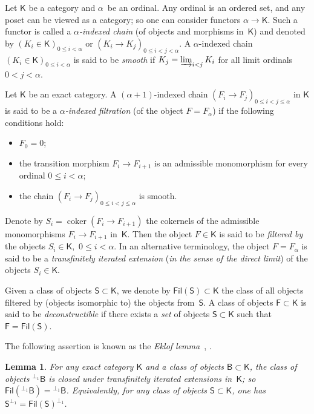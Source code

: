 \documentclass[12pt,a4paper]{amsart}
\newcommand{\+}{\nobreakdash-}
\renewcommand{\:}{\colon}
\newcommand{\rarrow}{\longrightarrow}
\DeclareMathOperator{\coker}{coker}
\newcommand{\sB}{\mathsf B}
\newcommand{\sF}{\mathsf F}
\newcommand{\sK}{\mathsf K}
\newcommand{\sS}{\mathsf S}
\newcommand{\Fil}{\mathsf{Fil}}
\theoremstyle{plain}
\newtheorem{lem}[thm]{Lemma}
\theoremstyle{definition}
\begin{document}
 Let $\sK$ be a category and $\alpha$~be an ordinal.
 Any ordinal is an ordered set, and any poset can be viewed as
a category; so one can consider functors $\alpha\rarrow\sK$.
 Such a functor is called a \emph{$\alpha$\+indexed chain} (of
objects and morphisms in~$\sK$) and denoted by
$(K_i\in\sK)_{0\le i<\alpha}$ or $(K_i\to K_j)_{0\le i<j<\alpha}$.
 A $\alpha$\+indexed chain $(K_i\in\sK)_{0\le i<\alpha}$ is said
to be \emph{smooth} if $K_j=\varinjlim_{i<j}K_i$ for all limit
ordinals $0<j<\alpha$.

 Let $\sK$ be an exact category.
 A $(\alpha+1)$\+indexed chain $(F_i\to F_j)_{0\le i<j\le\alpha}$ in
$\sK$ is said to be a \emph{$\alpha$\+indexed filtration} (of
the object $F=F_\alpha$) if the following conditions hold:
\begin{itemize}
\item $F_0=0$;
\item the transition morphism $F_i\rarrow F_{i+1}$ is an admissible
monomorphism for every ordinal $0\le i<\alpha$;
\item the chain $(F_i\to F_j)_{0\le i<j\le\alpha}$ is smooth.
\end{itemize}
 Denote by $S_i=\coker(F_i\to F_{i+1})$ the cokernels of the admissible
monomorphisms $F_i\rarrow F_{i+1}$ in~$\sK$.
 Then the object $F\in\sK$ is said to be \emph{filtered by}
the objects $S_i\in\sK$, \,$0\le i<\alpha$.
 In an alternative terminology, the object $F=F_\alpha$ is said to be
a \emph{transfinitely iterated extension} (\emph{in the sense of
the direct limit}) of the objects $S_i\in\sK$.

 Given a class of objects $\sS\subset\sK$, we denote by
$\Fil(\sS)\subset\sK$ the class of all objects filtered by
(objects isomorphic to) the objects from~$\sS$.
 A class of objects $\sF\subset\sK$ is said to be \emph{deconstructible}
if there exists a \emph{set} of objects $\sS\subset\sK$ such that
$\sF=\Fil(\sS)$.

 The following assertion is known as the \emph{Eklof
lemma}~\cite[Lemma~1]{ET}, \cite[Lemma~6.2]{GT}.

\begin{lem} \label{eklof-lemma}
 For any exact category\/ $\sK$ and a class of objects\/
$\sB\subset\sK$, the class of objects ${}^{\perp_1}\sB$ is closed
under transfinitely iterated extensions in\/~$\sK$; so\/
$\Fil({}^{\perp_1}\sB)={}^{\perp_1}\sB$.
 Equivalently, for any class of objects\/ $\sS\subset\sK$, one has\/
$\sS^{\perp_1}=\Fil(\sS)^{\perp_1}$.
\end{lem}
\end{document}
